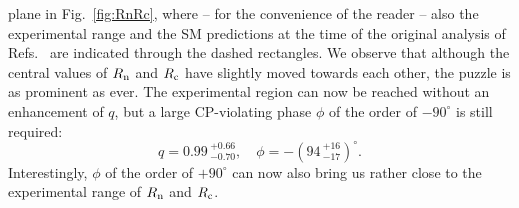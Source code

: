\documentclass[11pt]{cernrep}
\begin{document}
plane in Fig.~\ref{fig:RnRc}, where -- for the convenience of the reader --
also the experimental range and the SM predictions at the time of the 
original analysis of Refs.~\cite{BFRS2,BFRS3} are indicated through the dashed 
rectangles. 
We observe that although
the central values of $R_{\rm n}$ and $R_{\rm c}$ have slightly moved towards
each other, the puzzle is as prominent as ever. The experimental
region can now be reached without an enhancement of $q$, but
a large CP-violating phase $\phi$ of the order of $-90^\circ$ is
still required:
\begin{equation}
\label{q-phi}
q=0.99\,^{+0.66}_{-0.70} ,\quad \phi=-(94\,^{+16}_{-17} )^\circ.
\end{equation}
Interestingly, $\phi$ of the order of $+90^\circ$ can now also bring us rather 
close to the experimental range of $R_{\rm n}$ and $R_{\rm c}$. 
\end{document}
